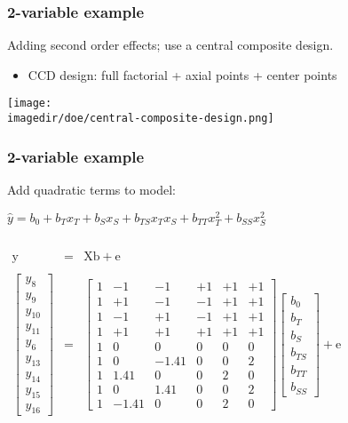 \begin{frame}\frametitle{2-variable example}

	Adding second order effects; use a central composite design.
	\begin{itemize}
		\item	CCD design: full factorial + axial points + center points
	\end{itemize}
	\begin{center}
		\texttt{[image: \\imagedir/doe/central-composite-design.png]}
	\end{center}
\end{frame}

\begin{frame}\frametitle{2-variable example}

	Add quadratic terms to model:

	$\hat{y} = b_0 + b_Tx_T + b_S x_S + b_{TS} x_T x_S + b_{TT} x_T^2 + b_{SS} x_S^2$

	$
	\begin{array}{rcl}
		\\
		\\
		\mathrm{y} &=& \mathrm{X} \mathrm{b} + \mathrm{e}\\
		\\
		\begin{bmatrix}
			y_8\\
			y_9\\
			y_{10} \\
			y_{11} \\
			y_{6} \\
			y_{13} \\
			y_{14} \\
			y_{15} \\
			y_{16}
		\end{bmatrix}
		&=&
		\begin{bmatrix}
			1 & -1 & -1 & +1 & +1 & +1\\
			1 & +1 & -1 & -1 & +1 & +1\\
			1 & -1 & +1 & -1 & +1 & +1\\
			1 & +1 & +1 & +1 & +1 & +1\\
			1 & 0 & 0 & 0 & 0 & 0\\
			1 & 0 &-1.41& 0 & 0 & 2\\
			1 & 1.41& 0& 0 & 2 & 0\\
			1 & 0 & 1.41& 0 & 0 & 2\\
			1 &-1.41& 0& 0 & 2 & 0
		\end{bmatrix}
		\begin{bmatrix}
			b_0 \\
			b_T \\
			b_S \\
			b_{TS} \\
			b_{TT} \\
			b_{SS}
		\end{bmatrix}
		+ \mathrm{e}
	\end{array}
	$
\end{frame}

